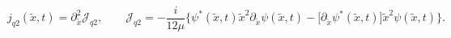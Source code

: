 \begin{equation}
\label{Eq:jq2}
j_{q2}(\tilde x, t)=\partial_{\tilde x}^2\mathcal{J}_{q2}, \qquad
\mathcal{J}_{q2}= -\frac{i}{12\mu}
\bigl \{ \psi^{*}(\tilde x,t)\tilde x^2
\partial_{\tilde x}\psi(\tilde x,t)-
\bigl [ \partial_{\tilde x}\psi^{*}(\tilde x,t) \bigr ]\tilde x^2
 \psi(\tilde x,t)
\bigr \}.
\end{equation}


